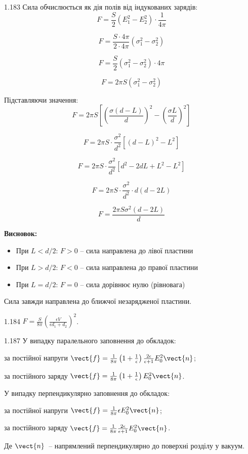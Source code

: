 \begin{Solution}{1.{183}}
Сила обчислюється як дія полів від індукованих зарядів:
$$F = \frac{S}{2}(E_1^2 - E_2^2) \cdot \frac{1}{4\pi}$$

$$F = \frac{S \cdot 4\pi}{2 \cdot 4\pi}(\sigma_1^2 - \sigma_2^2)$$

$$F = \frac{S}{2}(\sigma_1^2 - \sigma_2^2) \cdot 4\pi$$

$$F = 2\pi S(\sigma_1^2 - \sigma_2^2)$$

Підставляючи значення:
$$F = 2\pi S\left[\left(\frac{\sigma(d-L)}{d}\right)^2 - \left(\frac{\sigma L}{d}\right)^2\right]$$

$$F = 2\pi S \cdot \frac{\sigma^2}{d^2}[(d-L)^2 - L^2]$$

$$F = 2\pi S \cdot \frac{\sigma^2}{d^2}[d^2 - 2dL + L^2 - L^2]$$

$$F = 2\pi S \cdot \frac{\sigma^2}{d^2} \cdot d(d - 2L)$$

$$\boxed{F = \frac{2\pi S\sigma^2(d - 2L)}{d}}$$

\textbf{Висновок:}
\begin{itemize}
    \item При $L < d/2$: $F > 0$ -- сила направлена до лівої пластини
    \item При $L > d/2$: $F < 0$ -- сила направлена до правої пластини
    \item При $L = d/2$: $F = 0$ -- сила дорівнює нулю (рівновага)
\end{itemize}

Сила завжди направлена до ближчої незарядженої пластини.
\end{Solution}
\begin{Solution}{1.{184}}
	$ F = \frac{S}{8\pi} \left( \frac{\epsilon V}{ \epsilon d_1 + d_2} \right)^2 $.
\end{Solution}
\begin{Solution}{1.{187}}
		У випадку паралельного заповнення до обкладок:
		\begin{enumerate*}[label=\alph*)]
			\item за постійної напруги
			$\vect{f} = \frac{1}{8\pi}\left( 1+\frac1\epsilon\right) \frac{2\epsilon}{\epsilon + 1} E_0^2 \vect{n}$;
			\item за постійного заряду
			$\vect{f} = \frac{1}{8\pi}\left( 1+\frac1\epsilon\right) E_0^2 \vect{n}$.
		\end{enumerate*}
		У випадку перпендикулярно заповнення до обкладок:
		\begin{enumerate*}[label=\alph*)]
			\item за постійної напруги
			$\vect{f} = \frac{1}{8\pi}\epsilon E_0^2 \vect{n}$;
			\item за постійного заряду
			$\vect{f} = \frac{1}{8\pi} \frac{2\epsilon }{\epsilon + 1} E_0^2 \vect{n}$.
		\end{enumerate*}
		Де $\vect{n}$~-- напрямлений перпендикулярно до поверхні розділу у вакуум.
	
\end{Solution}
